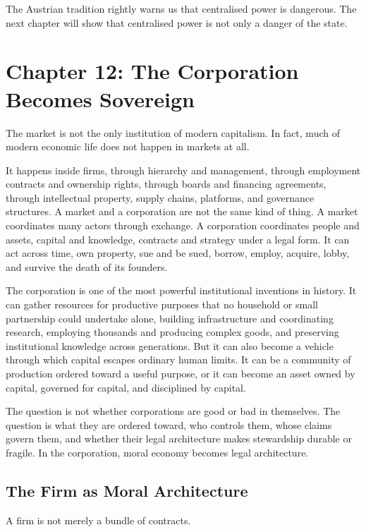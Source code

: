 \documentclass[11pt,a4paper,oneside]{book}
\begin{document}
The Austrian tradition rightly warns us that centralised power is dangerous. The next chapter will show that centralised power is not only a danger of the state.

\chapter*{Chapter 12: The Corporation Becomes Sovereign}

The market is not the only institution of modern capitalism. In fact, much of modern economic life does not happen in markets at all.

It happens inside firms, through hierarchy and management, through employment contracts and ownership rights, through boards and financing agreements, through intellectual property, supply chains, platforms, and governance structures. A market and a corporation are not the same kind of thing. A market coordinates many actors through exchange. A corporation coordinates people and assets, capital and knowledge, contracts and strategy under a legal form. It can act across time, own property, sue and be sued, borrow, employ, acquire, lobby, and survive the death of its founders.

The corporation is one of the most powerful institutional inventions in history. It can gather resources for productive purposes that no household or small partnership could undertake alone, building infrastructure and coordinating research, employing thousands and producing complex goods, and preserving institutional knowledge across generations. But it can also become a vehicle through which capital escapes ordinary human limits. It can be a community of production ordered toward a useful purpose, or it can become an asset owned by capital, governed for capital, and disciplined by capital.

The question is not whether corporations are good or bad in themselves. The question is what they are ordered toward, who controls them, whose claims govern them, and whether their legal architecture makes stewardship durable or fragile. In the corporation, moral economy becomes legal architecture.

\section*{The Firm as Moral Architecture}

A firm is not merely a bundle of contracts.
\end{document}
